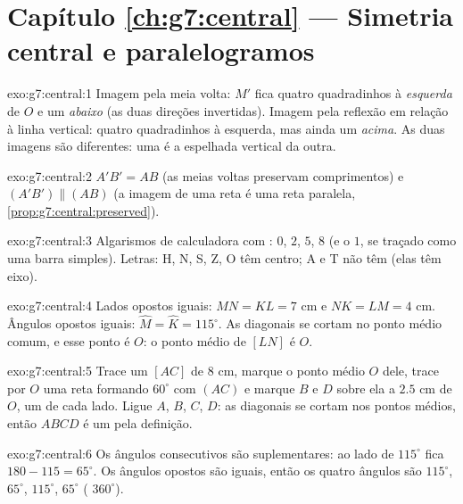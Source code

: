 \section*{Capítulo \ref{ch:g7:central} --- Simetria central e paralelogramos}

\begin{solution}{exo:g7:central:1}
Imagem pela meia volta: $M'$ fica quatro quadradinhos à
\emph{esquerda} de $O$ e um \emph{abaixo} (as duas direções
invertidas). Imagem pela reflexão em relação à linha vertical: quatro
quadradinhos à esquerda, mas ainda um \emph{acima}. As duas imagens são
diferentes: uma é a espelhada vertical da outra.
\end{solution}

\begin{solution}{exo:g7:central:2}
$A'B' = AB$ (as meias voltas preservam comprimentos) e
$(A'B') \parallel (AB)$ (a imagem de uma reta é uma reta paralela,
\cref{prop:g7:central:preserved}).
\end{solution}

\begin{solution}{exo:g7:central:3}
Algarismos de calculadora com : $0$, $2$, $5$, $8$ (e
o $1$, se traçado como uma barra simples). Letras: H, N, S, Z, O têm
centro; A e T não têm (elas têm eixo).
\end{solution}

\begin{solution}{exo:g7:central:4}
Lados opostos iguais: $MN = KL = 7$ cm e $NK = LM = 4$ cm. Ângulos
opostos iguais: $\widehat M = \widehat K = 115^\circ$. As diagonais se
cortam no ponto médio comum, e esse ponto é $O$: o ponto médio de
$[LN]$ é $O$.
\end{solution}

\begin{solution}{exo:g7:central:5}
Trace um  $[AC]$ de $8$ cm, marque o ponto médio $O$ dele,
trace por $O$ uma reta formando $60^\circ$ com $(AC)$ e marque $B$ e
$D$ sobre ela a $2.5$ cm de $O$, um de cada lado. Ligue $A$, $B$, $C$,
$D$: as diagonais se cortam nos pontos médios, então $ABCD$ é um
 pela definição.
\end{solution}

\begin{solution}{exo:g7:central:6}
Os ângulos consecutivos são suplementares: ao lado de $115^\circ$ fica
$180 - 115 = 65^\circ$. Os ângulos opostos são iguais, então os quatro
ângulos são $115^\circ$, $65^\circ$, $115^\circ$, $65^\circ$ (
$360^\circ$).
\end{solution}

